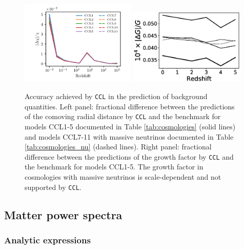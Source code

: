 \documentclass[\docopts]{\docclass}
\newcommand{\ccl}{{\tt CCL}\xspace}
\begin{document}
\begin{figure}
  \centering
  \includegraphics[width=0.49\textwidth]{distances}
  \includegraphics[width=0.49\textwidth]{growth}
  \caption{Accuracy achieved by \ccl in the prediction of background quantities. Left panel: fractional difference between the predictions of the comoving radial distance by \ccl and the benchmark for models CCL1-5 documented in Table \ref{tab:cosmologies} (solid lines) and models CCL7-11 with massive neutrinos documented in Table \ref{tab:cosmologies_nu} (dashed lines). Right panel: fractional difference between the predictions of the growth factor by \ccl and the benchmark for models CCL1-5. The growth factor in cosmologies with massive neutrinos is scale-dependent and not supported by \ccl.}
  \label{fig:distancegrow}
\end{figure}


\subsection{Matter power spectra}

\subsubsection{Analytic expressions}
\label{ss:bbksval}
\end{document}
